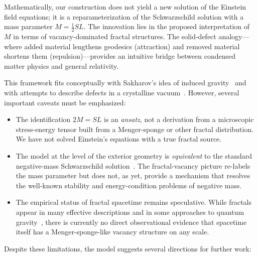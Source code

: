 \documentclass[%
  reprint,
  superscriptaddress,
  showpacs,
  showkeys,
  amsmath,amssymb,
  pra,
  longbibliography,
  floatfix,
  x11names
]{revtex4-2}
\begin{document}
Mathematically, our construction does not yield a new solution of the Einstein field equations; it is a reparameterization of the Schwarzschild solution with a mass parameter \(M=\tfrac{1}{2}SL\). The innovation lies in the proposed interpretation of \(M\) in terms of vacancy-dominated fractal structures. The solid-defect analogy---where added material lengthens geodesics (attraction) and removed material shortens them (repulsion)---provides an intuitive bridge between condensed matter physics and general relativity.

This framework fits conceptually with Sakharov's idea of induced gravity~\cite{Sakharov-67} and with attempts to describe defects in a crystalline vacuum~\cite{kleinert-1987,kleinert-2000,kroner-2001,kleinert-2004}. However, several important caveats must be emphasized:

\begin{itemize}
\item The identification \(2M = SL\) is an \emph{ansatz}, not a derivation from a microscopic stress-energy tensor built from a Menger-sponge or other fractal distribution. We have not solved Einstein's equations with a true fractal source.
\item The model at the level of the exterior geometry is \emph{equivalent} to the standard negative-mass Schwarzschild solution~\cite{bondi-1957}. The fractal-vacancy picture re-labels the mass parameter but does not, as yet, provide a mechanism that resolves the well-known stability and energy-condition problems of negative mass.
\item The empirical status of fractal spacetime remains speculative. While fractals appear in many effective descriptions and in some approaches to quantum gravity~\cite{Ambjorn2012_review,barkley-2019}, there is currently no direct observational evidence that spacetime itself has a Menger-sponge-like vacancy structure on any scale.
\end{itemize}

Despite these limitations, the model suggests several directions for further work:
\end{document}
